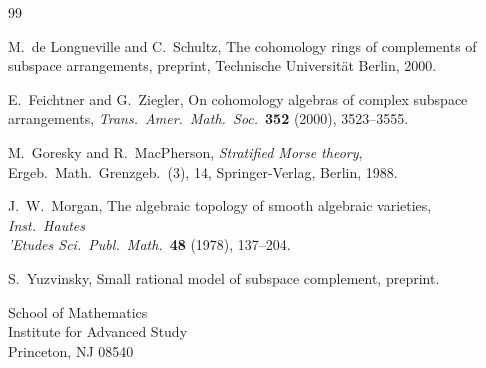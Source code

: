 \documentclass[11pt,a4paper]{article}
\theoremstyle{plain}
\theoremstyle{definition}
\begin{document}
\begin{thebibliography}{99}

M.~de Longueville and C.~Schultz, The cohomology rings of complements of subspace arrangements, preprint, Technische Universit\"at Berlin, 2000.

E.~Feichtner and G.~Ziegler, On cohomology algebras of complex subspace arrangements, \textit{Trans.\ Amer.\ Math.\ Soc.}\ \textbf{352} (2000), 3523--3555.

M.~Goresky and R.~MacPherson, \textit{Stratified Morse theory}, Ergeb.\ Math.\ Grenzgeb.\ (3), 14, Springer-Verlag, Berlin, 1988.

J.~W.~Morgan, The algebraic topology of smooth algebraic varieties, \textit{Inst.\ Hautes \\'Etudes Sci.\ Publ.\ Math.}\ \textbf{48} (1978), 137--204.

S.~Yuzvinsky, Small rational model of subspace complement, preprint.

\end{thebibliography}

\vspace{12pt}
\noindent
School of Mathematics\\
Institute for Advanced Study\\
Princeton, NJ 08540
\end{document}

